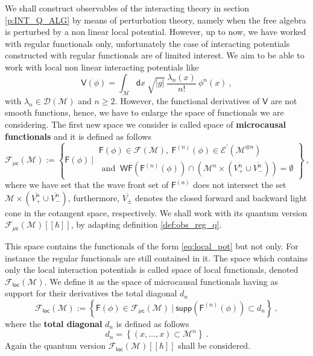 \documentclass[11pt]{book}
\newcommand{\supp}{\mathsf{supp}}
\newcommand{\WF}{\mathsf{WF}}
\newcommand{\loc}{\mathsf{loc}}
\newcommand{\muc}{\mu\csf}
\newcommand{\abs}[1]{\left|#1\right|}
\newcommand{\Dcal}{\mathcal{D}}
\newcommand{\Ecal}{\mathcal{E}}
\newcommand{\Fcal}{\mathcal{F}}
\newcommand{\Mcal}{\mathcal{M}}
\newcommand{\Fsf}{\mathsf{F}}
\newcommand{\Vsf}{\mathsf{V}}
\newcommand{\csf}{\mathsf{c}}
\newcommand{\dsf}{\mathsf{d}}
\theoremstyle{break}
\begin{document}
We shall construct observables of the interacting theory in section \ref{p:INT_Q_ALG} by means of perturbation theory, namely when the free algebra is perturbed by a non linear local potential. However, up to now, we have worked with regular functionals only, unfortunately the case of interacting potentials constructed with regular functionals are of limited interest. We aim to be able to work with local non linear interacting potentials like
%
\begin{equation}
\Vsf(\phi) = \int_\Mcal \dsf x \ \sqrt{\abs{g}} \ \frac{\lambda_n(x)}{n!} \ \phi^n(x) \ ,
\label{eq:local_pot}
\end{equation}
%
with $\lambda_n \in \Dcal(\Mcal)$ and $n\geq2$. However, the functional derivatives of $\Vsf$ are not smooth functions, hence, we have to enlarge the space of functionals we are considering. The first new space we consider is called space of \textbf{microcausal functionals} and it is defined as follows
%
\begin{equation}
\Fcal_{\muc}(\Mcal) := \left\{ 
\Fsf(\phi) \ \bigg| \ 
\begin{array}{l}
\Fsf(\phi) \in \Fcal(\Mcal), \ \Fsf^{(n)}(\phi) \in \Ecal^\prime(\Mcal^{\otimes n}) \\
\mbox{ and } \ \WF(\Fsf^{(n)}(\phi)) \cap \left( \Mcal^n \times ( \overline{V^{n}_{+}} \cup \overline{V^{n}_{-}} ) \right)  = \emptyset 
\end{array}
\right\} \ ,
\label{eq:func_micro}
\end{equation}
%
where we have set that the wave front set of $\Fsf^{(n)}$ does not intersect the set $\Mcal \times (\overline{V^n_+} \cup \overline{V^n_-})$, furthermore, $\overline{V_\pm}$ denotes the closed forward and backward light cone in the cotangent space, respectively. We shall work with its quantum version $\Fcal_{\muc}(\Mcal)[[\hbar]]$, by adapting definition \ref{def:obs_reg_q}.


This space contains the functionals of the form \eqref{eq:local_pot} but not only. For instance the regular functionals are still contained in it. The space which contains only the local interaction potentials is called space of local functionals, denoted $\mathcal{F}_\loc(\Mcal)$. We define it as the space of microcausal functionals having as support for their derivatives the total diagonal $d_n$
%
\begin{equation*}
\Fcal_\loc(\Mcal) := \left\{ \Fsf(\phi) \in \Fcal_{\mu\csf}(\Mcal) \ \bigg| \ \supp\left(\Fsf^{(n)}(\phi)\right) \subset d_n \right\} \ ,
\label{eq:func_loc}
\end{equation*}
%
where the \textbf{total diagonal} $d_n$ is defined as follows
%
\begin{equation}
d_n = \left\{ (x,\dots,x) \subset \Mcal^n \right\} \ .
\label{eq:total_diag}
\end{equation}
%
Again the quantum version $\Fcal_{\mathsf{loc}}(\Mcal)[[\hbar]]$ shall be considered.
\end{document}
